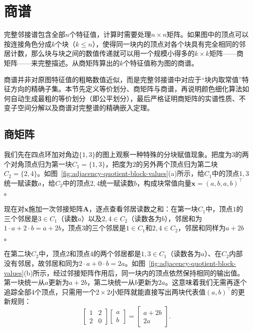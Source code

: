 \section{商谱}
\label{sec:adjacency-spectral-invariant}

完整邻接谱包含全部$n$个特征值，计算时需要处理$n\times n$矩阵。如果图中的顶点可以按连接角色分成$k$个块（$k\leq n$），使得同一块内的顶点对各个块具有完全相同的邻居计数，那么块与块之间的数值传递就可以用一个规模小得多的$k\times k$矩阵——商矩阵——来完整描述。从商矩阵算出的$k$个特征值称为图的商谱。

商谱并非对原图特征值的粗略数值近似，而是完整邻接谱中对应于“块内取常值”特征方向的精确子集。本节先定义等价划分、商矩阵与商谱，再说明颜色细化算法如何自动生成最粗的等价划分（即公平划分），最后严格证明商矩阵的实谱性质、不变子空间分解以及商谱对完整谱的精确嵌入定理。

\subsection{商矩阵}
\label{sec:adjacency-equitable-quotient}

我们先在四点环加对角边$\{1,3\}$的图上观察一种特殊的分块赋值现象。把度为$3$的两个对角顶点归为第一块$C_1=\{1,3\}$，把度为$2$的另外两个顶点归为第二块$C_2=\{2,4\}$。如图~\ref{fig:adjacency-quotient-block-values}(a)所示，给$C_1$中的顶点$1,3$统一赋读数$a$，给$C_2$中的顶点$2,4$统一赋读数$b$，构成块常值向量$\bm x=(a,b,a,b)^\top$。

现在对$\bm x$施加一次邻接矩阵$\bm A$，逐点查看邻居读数之和：在第一块$C_1$中，顶点$1$的三个邻居是$3\in C_1$（读数$a$）以及$2,4\in C_2$（读数各为$b$），邻居和为$1\cdot a+2\cdot b=a+2b$，顶点$3$的三个邻居是$1\in C_1$和$2,4\in C_2$，邻居和同样为$a+2b$。

在第二块$C_2$中，顶点$2$和顶点$4$的两个邻居都是$1,3\in C_1$（读数各为$a$）、在$C_2$内部没有邻居，故邻居和同为$2\cdot a+0\cdot b=2a$。如图~\ref{fig:adjacency-quotient-block-values}(b)所示，经过邻接矩阵作用后，同一块内的顶点依然保持相同的输出值。第一块统一从$a$更新为$a+2b$，第二块统一从$b$更新为$2a$。这意味着我们无需再逐个追踪全部$4$个顶点，只需用一个$2\times 2$小矩阵就能直接写出两块代表值$(a,b)^\top$的更新规则：
\[
\begin{bmatrix}1&2\\2&0\end{bmatrix}
\begin{bmatrix}a\\b\end{bmatrix}
=\begin{bmatrix}a+2b\\2a\end{bmatrix}.
\]

